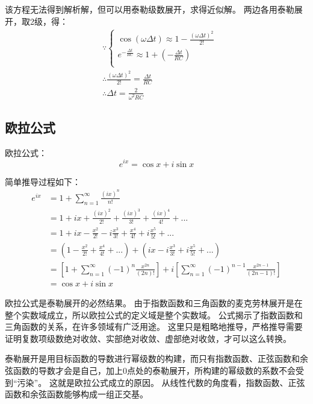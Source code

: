 该方程无法得到解析解，但可以用泰勒级数展开，求得近似解。
两边各用泰勒展开，取2级，得：
\begin{align*}
&\because \begin{cases}
	\cos \left( \omega \Delta t \right) \approx 1-\frac{\left( \omega \Delta t \right) ^2}{2!}\\
	e^{-\frac{\Delta t}{RC}}\approx 1+\left( -\frac{\Delta t}{RC} \right)\\
\end{cases} \\
&\therefore \frac{\left( \omega \Delta t \right) ^2}{2!}=\frac{\Delta t}{RC} \\
&\therefore \Delta t=\frac{2}{\omega ^2RC}
\end{align*}

\subsection{欧拉公式}

欧拉公式：
\[
e^{ix}=\cos x+i\sin x
\]

简单推导过程如下：
\begin{align*}
e^{ix}&=1+\sum_{n=1}^{\infty}{\frac{\left( ix \right) ^n}{n!}} \\
&=1+ix+\frac{\left( ix \right) ^2}{2!}+\frac{\left( ix \right) ^3}{3!}+\frac{\left( ix \right) ^4}{4!}+... \\
&=1+ix-\frac{x^2}{2!}-i\frac{x^3}{3!}+\frac{x^4}{4!}+i\frac{x^5}{5!}+...\\
&=\left( 1-\frac{x^2}{2!}+\frac{x^4}{4!}+... \right) +\left( ix-i\frac{x^3}{3!}+i\frac{x^5}{5!}+... \right) \\
&=\left[ 1+\sum_{n=1}^{\infty}{\left( -1 \right) ^n\frac{x^{2n}}{\left( 2n \right) !}} \right] +i\left[ \sum_{n=1}^{\infty}{\left( -1 \right) ^{n-1}\frac{x^{2n-1}}{\left( 2n-1 \right) !}} \right] \\
&=\cos x+i\sin x
\end{align*}

欧拉公式是泰勒展开的必然结果。
由于指数函数和三角函数的麦克劳林展开是在整个实数域成立，所以欧拉公式的定义域是整个实数域。
公式揭示了指数函数和三角函数的关系，在许多领域有广泛用途。
这里只是粗略地推导，严格推导需要证明复数项级数绝对收敛、实部绝对收敛、虚部绝对收敛，才可以这么转换。

\begin{tcolorbox}
泰勒展开是用目标函数的导数进行幂级数的构建，而只有指数函数、正弦函数和余弦函数的导数才会是自己，加上0点处的泰勒展开，所构建的幂级数的系数不会受到“污染”。
这就是欧拉公式成立的原因。
从线性代数的角度看，指数函数、正弦函数和余弦函数能够构成一组正交基。
\end{tcolorbox}




